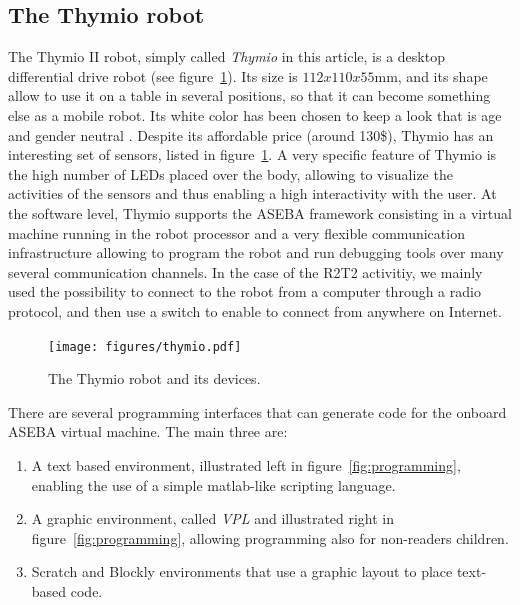 \documentclass{intech-journal}
\begin{document}
\subsection{The Thymio robot}

The Thymio II robot, simply called \textit{Thymio} in this article, is a desktop differential drive robot (see figure~\ref{fig:thymio}).
Its size is $112 x 110 x 55$mm, and its shape allow to use it on a table in several positions, so that it can become something else as a mobile robot.
Its white color has been chosen to keep a look that is age and gender neutral \cite{riedo2013thymio}.
Despite its affordable price (around 130\$), Thymio has an interesting set of sensors, listed in figure~\ref{fig:thymio}.
A very specific feature of Thymio is the high number of LEDs placed over the body, allowing to visualize the activities of the sensors and thus enabling a high interactivity with the user.
At the software level, Thymio supports the ASEBA framework \cite{magnenat2010aseba} consisting in a virtual machine running in the robot processor and a very flexible communication infrastructure allowing to program the robot and run debugging tools over many several communication channels. 
In the case of the R2T2 activitiy, we mainly used the possibility to connect to the robot from a computer through a radio protocol, and then use a switch to enable to connect from anywhere on Internet.

\begin{figure}[ht]
 \centering
    \texttt{[image: figures/thymio.pdf]}
  \caption{The Thymio robot and its devices.}
  \label{fig:thymio} 
\end{figure}

There are several programming interfaces that can generate code for the onboard ASEBA virtual machine. 
The main three are:
\begin{enumerate}
\item A text based environment, illustrated left in figure~\ref{fig:programming}, enabling the use of a simple matlab-like scripting language.
\item A graphic environment, called \textit{VPL} and illustrated right in figure~\ref{fig:programming}, allowing programming also for non-readers children.
\item Scratch and Blockly environments that use a graphic layout to place text-based code.
\end{enumerate}
\end{document}

